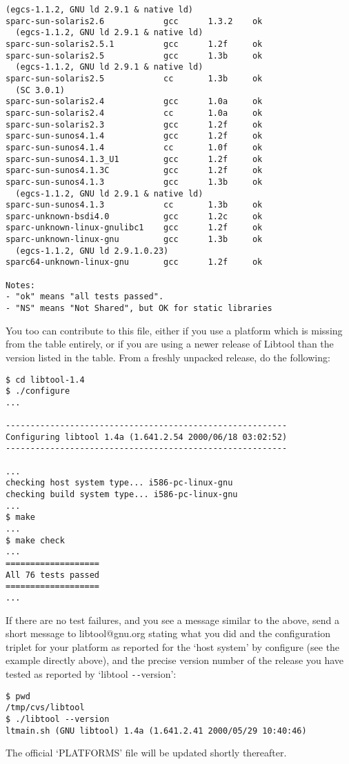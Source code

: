 \begin{Verbatim}[frame=single]
  (egcs-1.1.2, GNU ld 2.9.1 & native ld)
sparc-sun-solaris2.6            gcc      1.3.2    ok
  (egcs-1.1.2, GNU ld 2.9.1 & native ld)
sparc-sun-solaris2.5.1          gcc      1.2f     ok
sparc-sun-solaris2.5            gcc      1.3b     ok
  (egcs-1.1.2, GNU ld 2.9.1 & native ld)
sparc-sun-solaris2.5            cc       1.3b     ok
  (SC 3.0.1)
sparc-sun-solaris2.4            gcc      1.0a     ok
sparc-sun-solaris2.4            cc       1.0a     ok
sparc-sun-solaris2.3            gcc      1.2f     ok
sparc-sun-sunos4.1.4            gcc      1.2f     ok
sparc-sun-sunos4.1.4            cc       1.0f     ok
sparc-sun-sunos4.1.3_U1         gcc      1.2f     ok
sparc-sun-sunos4.1.3C           gcc      1.2f     ok
sparc-sun-sunos4.1.3            gcc      1.3b     ok
  (egcs-1.1.2, GNU ld 2.9.1 & native ld)
sparc-sun-sunos4.1.3            cc       1.3b     ok
sparc-unknown-bsdi4.0           gcc      1.2c     ok
sparc-unknown-linux-gnulibc1    gcc      1.2f     ok
sparc-unknown-linux-gnu         gcc      1.3b     ok
  (egcs-1.1.2, GNU ld 2.9.1.0.23)
sparc64-unknown-linux-gnu       gcc      1.2f     ok

Notes:
- "ok" means "all tests passed".
- "NS" means "Not Shared", but OK for static libraries
\end{Verbatim}

You too can contribute to this file, either if you use a platform which is missing from the table entirely, or if you are using a newer release of Libtool than the version listed in the table. From a freshly unpacked release, do the following:

\begin{Verbatim}[frame=single]
$ cd libtool-1.4
$ ./configure
...

---------------------------------------------------------
Configuring libtool 1.4a (1.641.2.54 2000/06/18 03:02:52)
---------------------------------------------------------

...
checking host system type... i586-pc-linux-gnu
checking build system type... i586-pc-linux-gnu
...
$ make
...
$ make check
...
===================
All 76 tests passed
===================
...
\end{Verbatim}

If there are no test failures, and you see a message similar to the above, send a short message to libtool@gnu.org stating what you did and the configuration triplet for your platform as reported for the `host system' by configure (see the example directly above), and the precise version number of the release you have tested as reported by `libtool \verb+--+version':

\begin{Verbatim}[frame=single]
$ pwd
/tmp/cvs/libtool
$ ./libtool --version
ltmain.sh (GNU libtool) 1.4a (1.641.2.41 2000/05/29 10:40:46)
\end{Verbatim}

The official `PLATFORMS' file will be updated shortly thereafter.

